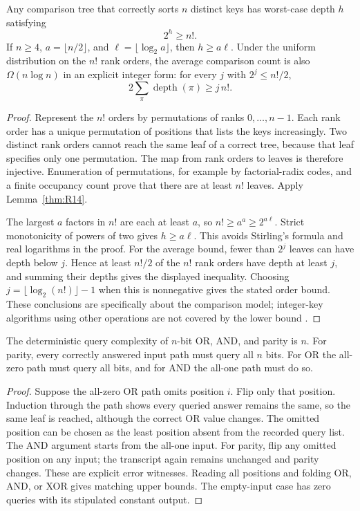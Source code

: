 \begin{theorem}
\label{thm:R15}
Any comparison tree that correctly sorts $n$ distinct keys has worst-case
depth $h$ satisfying
\[
 2^h\geq n!.
\]
If $n\geq4$, $a=\lfloor n/2\rfloor$, and
$\ell=\lfloor\log_2 a\rfloor$, then $h\geq a\ell$.
Under the uniform distribution on the $n!$ rank orders, the average
comparison count is also $\Omega(n\log n)$ in an explicit integer form:
for every $j$ with $2^j\leq n!/2$,
\[
 2\sum_{\pi}\operatorname{depth}(\pi)\geq j\,n!.
\]
\end{theorem}
\begin{proof}
Represent the $n!$ orders by permutations of ranks $0,\ldots,n-1$.
Each rank order has a unique permutation of positions that lists the
keys increasingly. Two distinct rank orders cannot reach the same leaf
of a correct tree, because that leaf specifies only one permutation.
The map from rank orders to leaves is therefore injective. Enumeration
of permutations, for example by factorial-radix codes, and a finite
occupancy count prove that there are at least $n!$ leaves. Apply
Lemma~\ref{thm:R14}.

The largest $a$ factors in $n!$ are each at least $a$, so
$n!\geq a^a\geq2^{a\ell}$. Strict monotonicity of powers of two gives
$h\geq a\ell$. This avoids Stirling's formula and real logarithms in
the proof. For the average bound, fewer than $2^j$ leaves can have depth
below $j$. Hence at least $n!/2$ of the $n!$ rank orders have depth at
least $j$, and summing their depths gives the displayed inequality.
Choosing $j=\lfloor\log_2(n!)\rfloor-1$ when this is nonnegative gives
the stated order bound. These conclusions are specifically about the
comparison model; integer-key algorithms using other operations are not
covered by the lower bound \cite{mit2010sorting}.
\end{proof}

\begin{theorem}\label{thm:R16}
The deterministic query complexity of $n$-bit OR, AND, and parity is $n$.
For parity, every correctly answered input path must query all $n$ bits.
For OR the all-zero path must query all bits, and for AND the all-one
path must do so.
\end{theorem}
\begin{proof}
Suppose the all-zero OR path omits position $i$. Flip only that position.
Induction through the path shows every queried answer remains the same,
so the same leaf is reached, although the correct OR value changes.
The omitted position can be chosen as the least position absent from
the recorded query list. The AND argument starts from the all-one input.
For parity, flip any omitted position on any input; the transcript again
remains unchanged and parity changes. These are explicit error witnesses.
Reading all positions and folding OR, AND, or XOR gives matching upper
bounds. The empty-input case has zero queries with its stipulated
constant output.
\end{proof}

